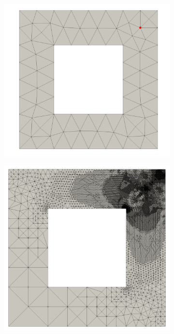 \begin{figure}[ht!]
\centering
\begin{subfigure}{.36\textwidth}
\centering
\includegraphics[width=.99\linewidth]{img/aut_squarehole_initial.png}
\end{subfigure}%
\begin{subfigure}{0.31\textwidth}
\centering
\includegraphics[width=.99\linewidth]{img/aut_squarehole_unif.png}

\end{subfigure}
\end{figure}
